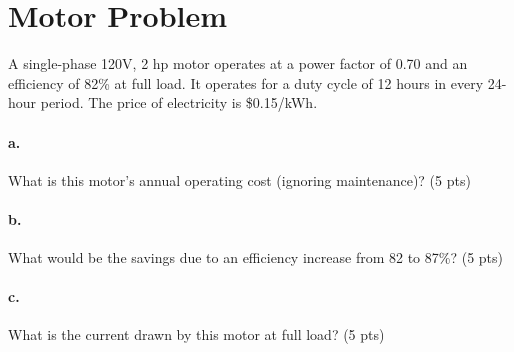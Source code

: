 \documentclass{article}
\newif\ifsolution
\newcommand{\solution}[1]
{\ifsolution
\vspace{10pt}
{\color{answer-color} #1}
\else\fi}
\newcommand{\ufrac}[2]{\frac{\textrm{#1}}{\textrm{#2}}}
\begin{document}
\section{Motor Problem}

A single-phase 120V, 2 hp motor operates at a power factor of 0.70 and
an efficiency of 82\% at full load.  It operates for a duty cycle of 12
hours in every 24-hour period.  The price of electricity is \$0.15/kWh.

\paragraph{a.} What is this motor's annual operating cost (ignoring maintenance)?
(5 pts)

\solution{
To begin, we estimate the electricity use over one year.  We then
multiply by the unit cost of electricity.
We calculate the electrical power for the motor from the delivered
mechanical power (2hp) and the efficiency.
$$ P = 2hp\cdot \ufrac{746W}{1hp} \ufrac{1 unit electrical power}{0.82
units mechanical power} = 1820 W$$
We then calculate the energy over the year.
$$ 1820W \cdot 365 days \cdot \ufrac{12 hours}{day} = 7969 kWh$$
Finally, the price paid for the electricity
$$7969 kWh \cdot 0.15 USD/kWh = 1195 \textrm{USD per year}$$
}

\paragraph{b.} What would be the savings due to an efficiency increase from 82 to
87\%? (5 pts)

\solution{
To find the cost for an 87\% efficient motore, we could repeat the
calculation above, or we could equivalently multiply by the ratio in
efficiencies.
$$ \$1195 \cdot \frac{0.82}{0.87} = \$1127 $$
The difference between these two figures is 68 USD per year.
}

\paragraph{c.} What is the current drawn by this motor at full load? (5 pts)

\solution{
The RMS current in the wire will be given by dividing the apparent power
by the voltage.  We find the apparent power by dividing the real power
by the power factor.
$$ S = \textrm{apparent power} = 1820 W \cdot \frac{1}{0.7} = 2.6 kVA $$
$$ I = S/V = 2600 VA / 120 = 21.7 A$$
If we had used the real power, we would have underestimated the current
in the wiring.
}
\end{document}
